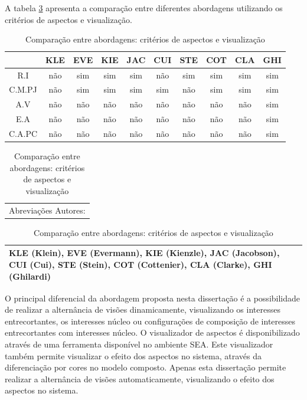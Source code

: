 A tabela \ref{tab:comparison_table_aspects_visualization} apresenta a comparação entre diferentes abordagens utilizando os critérios de aspectos e
visualização.

\begin{table}[h]
	\centering
	\begin{tabular}{ | c | c | c | c | c | c | c | c | c | c | }
		\hline
		 & KLE & EVE & KIE & JAC & CUI & STE & COT & CLA & GHI \\
		\hline
		 R.I & não & sim & sim & sim & não & sim & sim & sim & sim \\
		\hline
		 C.M.PJ & não & sim & sim & sim & sim & não & sim & sim & sim \\
		\hline
		 A.V & não & não & não & não & não & não & não & não & sim \\
		\hline
		 E.A & não & não & não & não & não & não & não & não & sim \\
		\hline
		 C.A.PC & não & não & não & não & não & não & não & não & sim \\
		\hline
	\end{tabular}
	
	\begin{tabular}{  p{11.5cm}  }
		Abreviações Autores: \\
	\end{tabular}
	
	\begin{tabular}{ | p{11.5cm} | }
		\hline
		KLE (Klein), EVE (Evermann), KIE (Kienzle), JAC (Jacobson), CUI (Cui), STE (Stein), COT (Cottenier), CLA (Clarke), GHI (Ghilardi) \\
		\hline
	\end{tabular}
	
	\caption{Comparação entre abordagens: critérios de aspectos e visualização}
	\label{tab:comparison_table_aspects_visualization}
\end{table} 

O principal diferencial da abordagem proposta nesta dissertação é a possibilidade de realizar a alternância de visões dinamicamente, visualizando os
interesses entrecortantes, os interesses núcleo ou configurações de composição de interesses entrecortantes com interesses núcleo. O visualizador de
aspectos é disponibilizado através de uma ferramenta disponível no ambiente SEA. Este visualizador também permite visualizar o efeito dos aspectos no
sistema, através da diferenciação por cores no modelo composto. Apenas esta dissertação permite realizar a alternância de visões automaticamente,
visualizando o efeito dos aspectos no sistema. 

